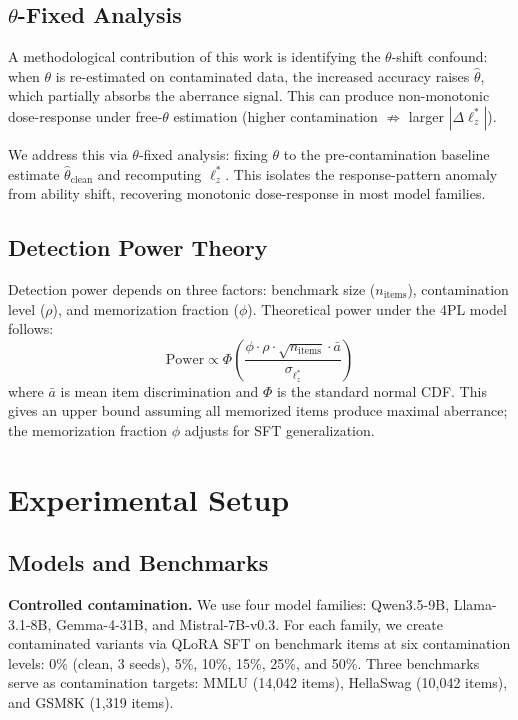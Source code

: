 \documentclass[11pt,a4paper]{article}
\begin{document}
\subsection{$\theta$-Fixed Analysis}

A methodological contribution of this work is identifying the $\theta$-shift confound: when $\theta$ is re-estimated on contaminated data, the increased accuracy raises $\hat{\theta}$, which partially absorbs the aberrance signal.
This can produce non-monotonic dose-response under free-$\theta$ estimation (higher contamination $\not\Rightarrow$ larger $|\Delta\ell_z^*|$).

We address this via $\theta$-fixed analysis: fixing $\theta$ to the pre-contamination baseline estimate $\hat{\theta}_\text{clean}$ and recomputing $\ell_z^*$.
This isolates the response-pattern anomaly from ability shift, recovering monotonic dose-response in most model families.

\subsection{Detection Power Theory}

Detection power depends on three factors: benchmark size ($n_\text{items}$), contamination level ($\rho$), and memorization fraction ($\phi$).
Theoretical power under the 4PL model follows:
\begin{equation}
\text{Power} \propto \Phi\!\left(\frac{\phi \cdot \rho \cdot \sqrt{n_\text{items}} \cdot \bar{a}}{\sigma_{\ell_z^*}}\right)
\end{equation}
where $\bar{a}$ is mean item discrimination and $\Phi$ is the standard normal CDF.
This gives an upper bound assuming all memorized items produce maximal aberrance; the memorization fraction $\phi$ adjusts for SFT generalization.

\section{Experimental Setup}

\subsection{Models and Benchmarks}

\textbf{Controlled contamination.}
We use four model families: Qwen3.5-9B, Llama-3.1-8B, Gemma-4-31B, and Mistral-7B-v0.3.
For each family, we create contaminated variants via QLoRA SFT on benchmark items at six contamination levels: 0\% (clean, 3 seeds), 5\%, 10\%, 15\%, 25\%, and 50\%.
Three benchmarks serve as contamination targets: MMLU (14,042 items), HellaSwag (10,042 items), and GSM8K (1,319 items).
\end{document}
